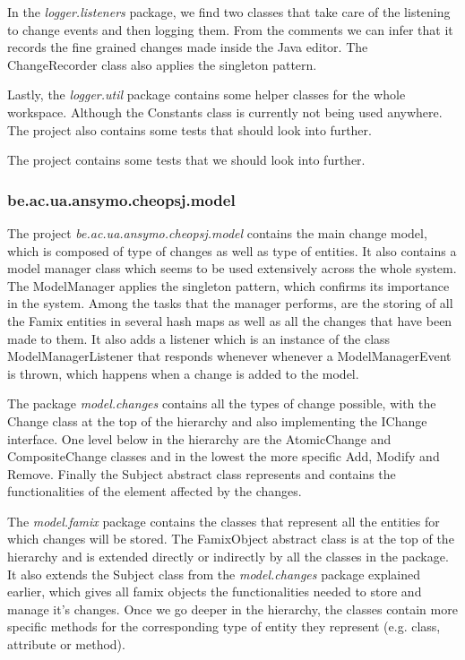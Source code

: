 \documentclass[a4paper]{article}
\begin{document}
In the \emph{logger.listeners} package, we find two classes that take care of the listening to change events and then logging them. From the comments we can infer that it records the fine grained changes made inside the Java editor. The ChangeRecorder class also applies the singleton pattern.

Lastly, the \emph{logger.util} package contains some helper classes for the whole workspace. Although the Constants class is currently not being used anywhere. 
The project also contains some tests that should look into further.

The project contains some tests that we should look into further.

\subsubsection{be.ac.ua.ansymo.cheopsj.model}
The project \emph{be.ac.ua.ansymo.cheopsj.model} contains the main change model, which is composed of type of changes as well as type of entities. It also contains a model manager class which seems to be used extensively across the whole system. The ModelManager applies the singleton pattern, which confirms its importance in the system. Among the tasks that the manager performs, are the storing of all the Famix entities in several hash maps as well as all the changes that have been made to them. It also adds a listener which is an instance of the class ModelManagerListener that responds whenever whenever a ModelManagerEvent is thrown, which happens when a change is added to the model.

The package \emph{model.changes} contains all the types of change possible, with the Change class at the top of the hierarchy and also implementing the IChange interface. One level below in the hierarchy are the AtomicChange and CompositeChange classes and in the lowest the more specific Add, Modify and Remove. Finally the Subject abstract class represents and contains the functionalities of the element affected by the changes.

The \emph{model.famix} package contains the classes that represent all the entities for which changes will be stored. The FamixObject abstract class is at the top of the hierarchy and is extended directly or indirectly by all the classes in the package. It also extends the Subject class from the \emph{model.changes} package explained earlier, which gives all famix objects the functionalities needed to store and manage it's changes. Once we go deeper in the hierarchy, the classes contain more specific methods for the corresponding type of entity they represent (e.g. class, attribute or method).
\end{document}
